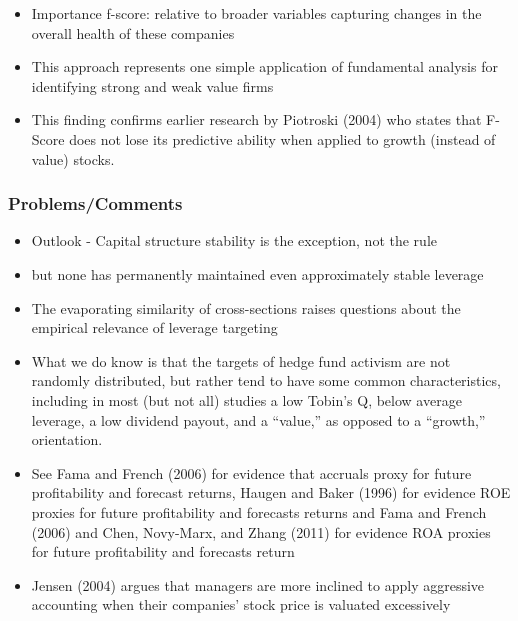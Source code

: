 \documentclass[12pt]{article}
\begin{document}
\begin{itemize}
            \item Importance f-score: relative to broader variables capturing changes in the overall health of these companies \citep{Piotroski2000}

            \item This approach represents one simple application of fundamental analysis for identifying strong and weak value firms \citep{Piotroski2000}

            \item This finding confirms earlier research by Piotroski (2004) who states that F-Score does not lose its predictive ability when applied to growth (instead of value) stocks. \citep{Mohr2012}

        \end{itemize}

    \subsubsection{Problems/Comments}

        \begin{itemize}

            \item Outlook - Capital structure stability is the exception, not the rule \citep{Deangelo2015}

            \item but none has permanently maintained even approximately stable leverage \citep{Deangelo2015}

            \item The evaporating similarity of cross-sections raises questions about the empirical relevance of leverage targeting \citep{Deangelo2015}

            \item What we do know is that the targets of hedge fund activism are not randomly distributed, but rather tend to have some common characteristics, including in most (but not all) studies a low Tobin’s Q, below average leverage, a low dividend payout, and a “value,” as opposed to a “growth,” orientation. \citep{CoffeeJr.2014}


            \item See Fama and French (2006) for evidence that accruals proxy for future profitability and forecast returns, Haugen and Baker (1996) for evidence ROE proxies for future profitability and forecasts returns and Fama and French (2006) and Chen, Novy-Marx, and Zhang (2011) for evidence ROA proxies for future profitability and forecasts return \citep{Choi2012}
            
            \item Jensen (2004) argues that managers are more inclined to apply aggressive accounting when their companies’ stock price is valuated excessively \citep{Mohr2012}
        \end{itemize}
    
\end{document}
